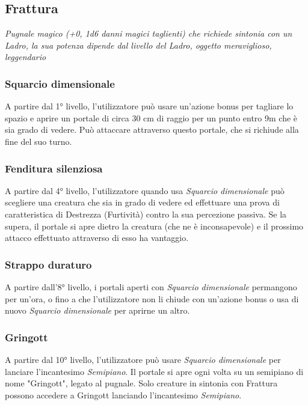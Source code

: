 \subsection{Frattura}
\textit{Pugnale magico (+0, 1d6 danni magici taglienti) che richiede sintonia con un Ladro, la sua potenza dipende dal livello del Ladro, oggetto meraviglioso, leggendario}

\subsubsection{Squarcio dimensionale}
A partire dal 1° livello, l'utilizzatore può usare un'azione bonus per tagliare lo spazio e aprire un portale di circa 30 cm di raggio per un punto entro 9m che è sia grado di vedere. Può attaccare attraverso questo portale, che si richiude alla fine del suo turno.

\subsubsection{Fenditura silenziosa}
A partire dal 4° livello, l'utilizzatore quando usa \textit{Squarcio dimensionale} può scegliere una creatura che sia in grado di vedere ed effettuare una prova di caratteristica di Destrezza (Furtività) contro la sua percezione passiva. Se la supera, il portale si apre dietro la creatura (che ne è inconsapevole) e il prossimo attacco effettuato attraverso di esso ha vantaggio.

\subsubsection{Strappo duraturo}
A partire dall'8° livello, i portali aperti con \textit{Squarcio dimensionale} permangono per un'ora, o fino a che l'utilizzatore non li chiude con un'azione bonus o usa di nuovo \textit{Squarcio dimensionale} per aprirne un altro.

\subsubsection{Gringott}
A partire dal 10° livello, l'utilizzatore può usare \textit{Squarcio dimensionale} per lanciare l'incantesimo \textit{Semipiano}. Il portale si apre ogni volta su un semipiano di nome "Gringott", legato al pugnale. Solo creature in sintonia con Frattura possono accedere a Gringott lanciando l'incantesimo \textit{Semipiano}.

